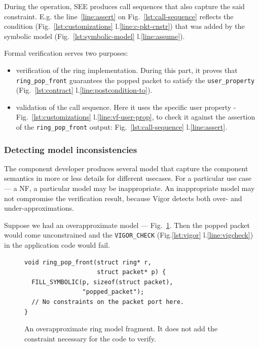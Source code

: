 \documentclass[letterpaper,twocolumn,10pt]{article}
\newcommand{\code}[1]{\lstinline{#1}}
\begin{document}
During the operation, SEE produces call sequences that also capture the said
constraint. E.g. the line~\ref{line:assert} on Fig.~\ref{lst:call-sequence}
reflects the condition (Fig.~\ref{lst:customizations} l.\ref{line:c-pkt-cnstr})
that was added by the symbolic model (Fig.~\ref{lst:symbolic-model}
l.\ref{line:assume}).

Formal verification serves two purposes:
\begin{itemize}
\item verification of the ring implementation. During this part, it proves that
  \code{ring_pop_front} guarantees the popped packet to satisfy the
  \code{user_property} (Fig.~\ref{lst:contract} l.\ref{line:postcondition-to}).
\item validation of the call sequence. Here it uses the specific user property -
  Fig.~\ref{lst:customizations} l.\ref{line:vf-user-prop}, to check it against
  the assertion of the \code{ring_pop_front} output:
  Fig.~\ref{lst:call-sequence} l.\ref{line:assert}.
\end{itemize}

\subsubsection{Detecting model inconsistencies}

The component developer produces several model that capture the component
semantics in more or less details for different usecases. For a particular use
case --- a NF, a particular model may be inappropriate. An inappropriate model
may not compromise the verification result, because Vigor detects both
over- and under-approximations.

Suppose we had an overapproximate model --- Fig.~\ref{lst:overapproximate}. Then
the popped packet would come unconstrained and the \code{VIGOR_CHECK}
(Fig.\ref{lst:vigor} l.\ref{line:vigcheck}) in the application code would fail.
\begin{figure}[h!]
\begin{lstlisting}
void ring_pop_front(struct ring* r,
                    struct packet* p) {
  FILL_SYMBOLIC(p, sizeof(struct packet),
                "popped_packet");
  // No constraints on the packet port here.
}
\end{lstlisting}
  \caption{An overapproximate ring model fragment. It does not add the
    constraint necessary for the code to verify.}
  \label{lst:overapproximate}
\end{figure}
\end{document}
